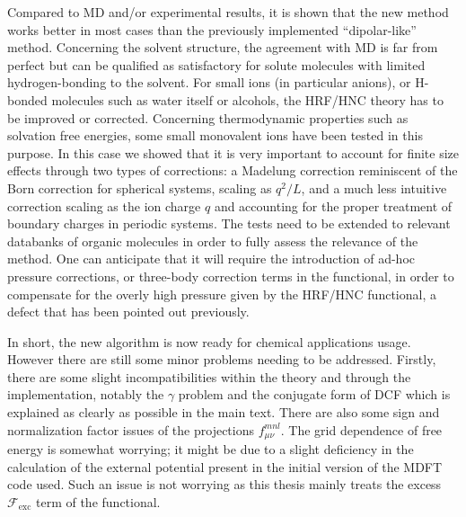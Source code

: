 Compared to \acs{MD} and/or experimental results, it is shown that
the new method works better in most cases than the previously implemented
``dipolar-like'' method. Concerning the solvent structure, the agreement
with \acs{MD} is far from perfect but can be qualified as satisfactory
for solute molecules with limited hydrogen-bonding to the solvent.
For small ions (in particular anions), or H-bonded molecules such
as water itself or alcohols, the \acs{HRF}/\acs{HNC} theory has
to be improved or corrected. Concerning thermodynamic properties such
as solvation free energies, some small monovalent ions have been
tested in this purpose. In this case we showed that it is very important
to account for finite size effects through two types of corrections:
a Madelung correction reminiscent of the Born correction for spherical
systems, scaling as $q^{2}/L$, and a much less intuitive correction
scaling as the ion charge $q$ and accounting for the proper treatment
of boundary charges in periodic systems. The tests need to be
extended to relevant databanks of organic molecules in order to fully
assess the relevance of the method. One can anticipate that it will
require the introduction of ad-hoc pressure corrections, or three-body
correction terms in the functional, in order to compensate for the overly
high pressure given by the \acs{HRF}/\acs{HNC} functional, a
defect that has been pointed out previously.

In short, the new algorithm is now ready for chemical applications
usage. However there are still some minor problems needing to be addressed.
Firstly, there are some slight incompatibilities within
the theory and through the implementation, notably the $\gamma$ problem
and the conjugate form of \acs{DCF} which is explained as clearly
as possible in the main text. There are also some sign and normalization
factor issues of the projections $f_{\mu\nu}^{mnl}$. The grid dependence
of free energy is somewhat worrying; it might be due to a slight
deficiency in the calculation of the external potential present in
the initial version of the \acf{MDFT} code used. Such an issue is not
worrying as this thesis mainly treats the excess $\mathcal{F}_{\mathrm{exc}}$
term of the functional.
